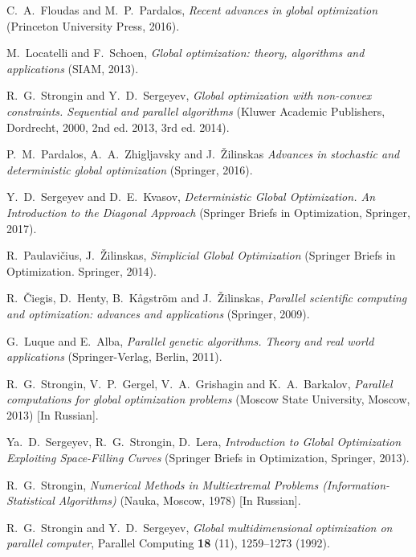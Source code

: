 \documentclass[
11pt,%
tightenlines,%
twoside,%
onecolumn,%
nofloats,%
nobibnotes,%
nofootinbib,%
superscriptaddress,%
noshowpacs,%
centertags]%
{revtex4}
\begin{document}
\begin{thebibliography}{20}

C.~A.~Floudas and M.~P.~Pardalos, \textit{Recent advances in global optimization} (Princeton University Press, 2016).

M.~Locatelli and F.~Schoen, \textit{Global optimization: theory, algorithms and applications} (SIAM, 2013).

R.~G.~Strongin and Y.~D.~Sergeyev, \textit{Global optimization with non-convex constraints. Sequential and parallel algorithms} (Kluwer Academic Publishers, Dordrecht, 2000, 2nd ed. 2013, 3rd ed. 2014).

P.~M.~Pardalos, A.~A.~Zhigljavsky and J.~\v{Z}ilinskas \textit{Advances in stochastic and deterministic global optimization} (Springer, 2016).

Y.~D.~Sergeyev and D.~E.~Kvasov, \textit{Deterministic Global Optimization. An Introduction to the Diagonal Approach}  (Springer Briefs in Optimization, Springer, 2017).

R.~Paulavi\v{c}ius, J.~\v{Z}ilinskas, \textit{Simplicial Global Optimization} (Springer Briefs in Optimization. Springer, 2014).

R.~\v{C}iegis, D.~Henty, B.~K\r{a}gstr\"om and J.~\v{Z}ilinskas, \textit{Parallel scientific computing and optimization: advances and applications}  (Springer, 2009). 

G.~Luque and E.~Alba, \textit{Parallel genetic algorithms. Theory and real world applications} (Springer-Verlag, Berlin, 2011).

R.~G.~Strongin, V.~P.~Gergel, V.~A.~Grishagin and K.~A.~Barkalov, \textit{Parallel computations for global optimization problems} (Moscow State University, Moscow, 2013) [In Russian].

Ya.~D.~Sergeyev, R.~G.~Strongin, D.~Lera, \textit{Introduction to Global Optimization Exploiting Space-Filling Curves} (Springer Briefs in Optimization, Springer, 2013).

R.~G.~Strongin, \textit{Numerical Methods in Multiextremal Problems (Information-Statistical Algorithms)} (Nauka, Moscow, 1978) [In Russian].

R.~G.~Strongin and Y.~D.~Sergeyev, \textit{Global multidimensional optimization on parallel computer}, Parallel Computing \textbf{18} (11), 1259--1273 (1992).


\end{thebibliography}
\end{document}
